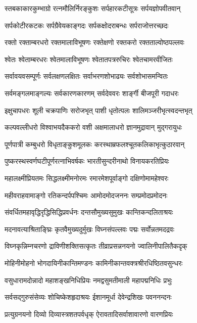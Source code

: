 \twolineshloka
{स्तबकाकारकुम्भाग्रो रत्नमौलिर्निरङ्कुशः}
{सर्पहारकटीसूत्रः सर्पयज्ञोपवीतवान्}

\twolineshloka
{सर्पकोटीरकटकः सर्पग्रैवेयकाङ्गदः}
{सर्पकक्षोदराबन्धः सर्पराजोत्तरच्छदः}

\twolineshloka
{रक्तो रक्ताम्बरधरो रक्तमालाविभूषणः}
{रक्तेक्षणो रक्तकरो रक्तताल्वोष्ठपल्लवः}

\twolineshloka
{श्वेतः श्वेताम्बरधरः श्वेतमालाविभूषणः}
{श्वेतातपत्ररुचिरः श्वेतचामरवीजितः}

\twolineshloka
{सर्वावयवसम्पूर्णः सर्वलक्षणलक्षितः}
{सर्वाभरणशोभाढ्यः सर्वशोभासमन्वितः}

\twolineshloka
{सर्वमङ्गलमाङ्गल्यः सर्वकारणकारणम्}
{सर्वदेववरः शार्ङ्गी बीजपूरी गदाधरः}


\twolineshloka
{इक्षुचापधरः शूली चक्रपाणिः सरोजभृत्}
{पाशी धृतोत्पलः शालिमञ्जरीभृत्स्वदन्तभृत्}

\twolineshloka
{कल्पवल्लीधरो विश्वाभयदैककरो वशी}
{अक्षमालाधरो ज्ञानमुद्रावान् मुद्गरायुधः}

\twolineshloka
{पूर्णपात्री कम्बुधरो विधृताङ्कुशमूलकः}
{करस्थाम्रफलश्चूतकलिकाभृत्कुठारवान्}

\twolineshloka
{पुष्करस्थस्वर्णघटीपूर्णरत्नाभिवर्षकः}
{भारतीसुन्दरीनाथो विनायकरतिप्रियः}

\twolineshloka
{महालक्ष्मीप्रियतमः सिद्धलक्ष्मीमनोरमः}
{रमारमेशपूर्वाङ्गो दक्षिणोमामहेश्वरः}

\twolineshloka
{महीवराहवामाङ्गो रतिकन्दर्पपश्चिमः}
{आमोदमोदजननः सम्प्रमोदप्रमोदनः}

\twolineshloka
{संवर्धितमहावृद्धिरृद्धिसिद्धिप्रवर्धनः}
{दन्तसौमुख्यसुमुखः कान्तिकन्दलिताश्रयः}

\twolineshloka
{मदनावत्याश्रिताङ्घ्रिः कृतवैमुख्यदुर्मुखः}
{विघ्नसंपल्लवः पद्मः सर्वोन्नतमदद्रवः}

\twolineshloka
{विघ्नकृन्निम्नचरणो द्राविणीशक्तिसत्कृतः}
{तीव्राप्रसन्ननयनो ज्वालिनीपालितैकदृक्}

\twolineshloka
{मोहिनीमोहनो भोगदायिनीकान्तिमण्डनः}
{कामिनीकान्तवक्त्रश्रीरधिष्ठितवसुन्धरः}

\twolineshloka
{वसुधारामदोन्नादो महाशङ्खनिधिप्रियः}
{नमद्वसुमतीमाली महापद्मनिधिः प्रभुः}

\twolineshloka
{सर्वसद्गुरुसंसेव्यः शोचिष्केशहृदाश्रयः}
{ईशानमूर्धा देवेन्द्रशिखः पवननन्दनः}

\twolineshloka
{प्रत्युग्रनयनो दिव्यो दिव्यास्त्रशतपर्वधृक्}
{ऐरावतादिसर्वाशावारणो वारणप्रियः}

